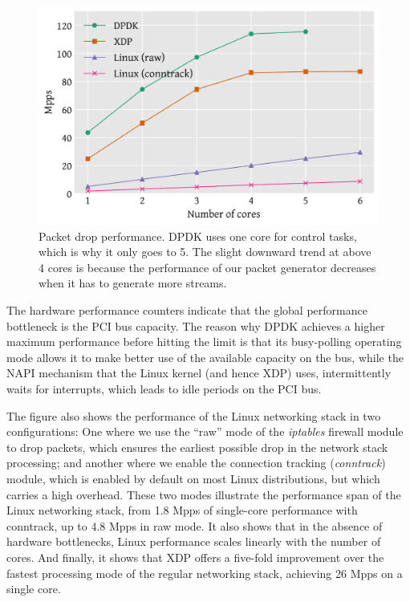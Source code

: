 \documentclass[10pt,sigconf,anonymous]{acmart}
\begin{document}
\begin{figure}[t]
\centering
\includegraphics[width=\linewidth]{figures/drop-test.pdf}
\caption{\label{fig:drop-test} Packet drop performance. DPDK uses one core for
  control tasks, which is why it only goes to 5. The slight downward trend at
  above 4 cores is because the performance of our packet generator decreases
  when it has to generate more streams.}
\end{figure}


The hardware performance counters indicate that the global performance
bottleneck is the PCI bus capacity. The reason why DPDK achieves a higher
maximum performance before hitting the limit is that its busy-polling operating
mode allows it to make better use of the available capacity on the bus, while
the NAPI mechanism that the Linux kernel (and hence XDP) uses, intermittently
waits for interrupts, which leads to idle periods on the PCI bus.

The figure also shows the performance of the Linux networking stack in two
configurations: One where we use the ``raw'' mode of the \emph{iptables}
firewall module to drop packets, which ensures the earliest possible drop in the
network stack processing; and another where we enable the connection tracking
(\emph{conntrack}) module, which is enabled by default on most Linux
distributions, but which carries a high overhead. These two modes illustrate the
performance span of the Linux networking stack, from 1.8 Mpps of single-core
performance with conntrack, up to 4.8 Mpps in raw mode. It also shows that in
the absence of hardware bottlenecks, Linux performance scales linearly with the
number of cores. And finally, it shows that XDP offers a five-fold improvement
over the fastest processing mode of the regular networking stack, achieving 26
Mpps on a single core.
\end{document}
